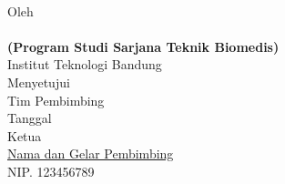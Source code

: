 \clearpage
\pagestyle{empty}

\begin{center}

    \large{\bfseries \MakeUppercase{\thetitle}}
    \\[2\baselineskip]
	
	\renewcommand{\baselinestretch}{1}
    \normalsize{Oleh\\
    \textbf{\theauthor}\\
    \textbf{(Program Studi Sarjana Teknik Biomedis)}
    \\[\baselineskip]
    Institut Teknologi Bandung}
    \\[3\baselineskip]

    \normalsize{Menyetujui\\
    Tim Pembimbing
    \\[\baselineskip]
    
    Tanggal \thedate\\[3\baselineskip]
    Ketua\\[4\baselineskip]
    \underline{Nama dan Gelar Pembimbing}\\
    NIP. 123456789}

\end{center}
\clearpage
